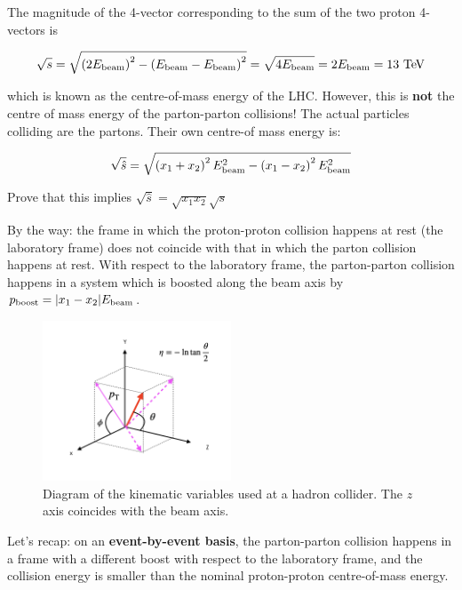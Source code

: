 The magnitude of the 4-vector corresponding to the sum of the two proton 4-vectors is 

\begin{align}
\sqrt{s} = \sqrt{\left(2E_{\mathrm{beam}}\right)^2 - \left(E_{\mathrm{beam}}-E_{\mathrm{beam}}\right)^2} = \sqrt{4E_{\mathrm{beam}}} = 2E_{\mathrm{beam}} = 13\ \text{Te\kern -0.1em V}
\end{align}

\noindent which is known as the centre-of-mass energy of the LHC. However, this is \textbf{not} the centre of mass energy of the parton-parton collisions! The actual particles colliding are the partons. Their own centre-of mass energy is:

\begin{align*}
\sqrt{\hat{s}} = \sqrt{\left( x_1 + x_2 \right) ^2 E_{\mathrm{beam}}^2 - \left( x_1 - x_2\right)^2 E_{\mathrm{beam}}^2}
\end{align*}

\begin{exercise}
Prove that this implies $\sqrt{\hat{s}} = \sqrt{x_1 x_2} \sqrt{s}$
\end{exercise}

By the way: the frame in which the proton-proton collision happens at rest (the laboratory frame) does not coincide with that in which the parton collision happens at rest. With respect to the laboratory frame, the parton-parton collision happens in a system which is boosted along the beam axis by $p_{\mathrm{boost}} = |x_1-x_2| E_{\mathrm{beam}}$.

 \begin{figure}[!h]
\begin{center}
\includegraphics[width=0.5\textwidth]{./Figures/collider_physics_variables.png}
\end{center}
\caption{Diagram of the kinematic variables used at a hadron collider. The $z$ axis coincides with the beam axis.}
\label{fig:collider_variables}
\end{figure}


Let's recap: on an \textbf{event-by-event basis}, the parton-parton collision happens in a frame with a different boost with respect to the laboratory frame, and the collision energy is smaller than the nominal proton-proton centre-of-mass energy. 

